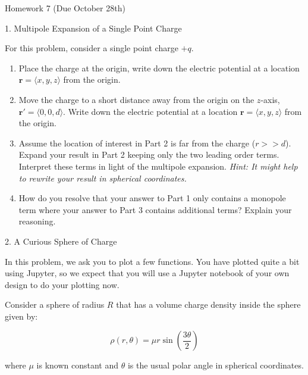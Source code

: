 \documentclass[11pt]{article}
\def\tightlist{}
\begin{document}
{\LARGE Homework 7 (Due October
28th)}\label{homework-7-due-october-28th}

{\Large 1. Multipole Expansion of a Single Point
Charge}\label{multipole-expansion-of-a-single-point-charge}

For this problem, consider a single point charge \(+q\).

\begin{enumerate}
\def\labelenumi{\arabic{enumi}.}
\tightlist
\item
  Place the charge at the origin, write down the electric potential at a
  location \(\mathbf{r} = \langle x,y,z \rangle\) from the origin.
\item
  Move the charge to a short distance away from the origin on the
  \(z\)-axis, \(\mathbf{r}' = \langle 0,0,d\rangle\). Write down the
  electric potential at a location
  \(\mathbf{r} = \langle x,y,z \rangle\) from the origin.
\item
  Assume the location of interest in Part 2 is far from the charge
  (\(r>>d\)). Expand your result in Part 2 keeping only the two leading
  order terms. Interpret these terms in light of the multipole
  expansion. \emph{Hint: It might help to rewrite your result in
  spherical coordinates.}
\item
  How do you resolve that your answer to Part 1 only contains a monopole
  term where your answer to Part 3 contains additional terms? Explain
  your reasoning.
\end{enumerate}

{\Large 2. A Curious Sphere of
Charge}\label{a-curious-sphere-of-charge}

In this problem, we ask you to plot a few functions. You have plotted
quite a bit using Jupyter, so we expect that you will use a Jupyter
notebook of your own design to do your plotting now.

Consider a sphere of radius \(R\) that has a volume charge density
inside the sphere given by:

\[\rho(r,\theta) = \mu r \sin\left(\dfrac{3\theta}{2}\right)\]

where \(\mu\) is known constant and \(\theta\) is the usual polar angle
in spherical coordinates.
\end{document}
